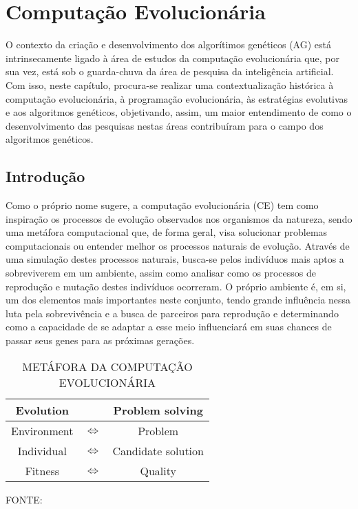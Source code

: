\chapter{Computação Evolucionária}

O contexto da criação e desenvolvimento dos algorítimos genéticos (AG) está intrinsecamente ligado à área de estudos da computação evolucionária que, por sua vez, está sob o guarda-chuva da área de pesquisa da inteligência artificial. Com isso, neste capítulo, procura-se realizar uma contextualização histórica à computação evolucionária, à programação evolucionária, às estratégias evolutivas e aos algoritmos genéticos, objetivando, assim, um maior entendimento de como o desenvolvimento das pesquisas nestas áreas contribuíram para o campo dos algoritmos genéticos.

\section{Introdução}

Como o próprio nome sugere, a computação evolucionária (CE) tem como inspiração os processos de evolução observados nos organismos da natureza, sendo uma metáfora computacional que, de forma geral, visa solucionar problemas computacionais ou entender melhor os processos naturais de evolução. Através de uma simulação destes processos naturais, busca-se pelos indivíduos mais aptos a sobreviverem em um ambiente, assim como analisar como os processos de reprodução e mutação destes indivíduos ocorreram. O próprio ambiente é, em si, um dos elementos mais importantes neste conjunto, tendo grande influência nessa luta pela sobrevivência e a busca de parceiros para reprodução e determinando como a capacidade de se adaptar a esse meio influenciará em suas chances de passar seus genes para as próximas gerações.

\begin{table}[h!]
	\caption{\uppercase{Metáfora da Computação Evolucionária}}
	\small
	\centering
	\vspace{2pt}
	\def\arraystretch{1.2}
	\begin{tabular}{ |ccc| }
		\hline
		Evolution & ~ & Problem solving \\ \hline
		Environment & $\Longleftrightarrow$ & Problem \\
		Individual & $\Longleftrightarrow$ & Candidate solution \\
		Fitness & $\Longleftrightarrow$ & Quality \\ \hline
	\end{tabular}
	\label{tab:EvolutionaryComputingMetaphor}
	\begin{minipage}{1 \textwidth}
		\centering
		\vspace{6pt}
		FONTE:~\cite{eiben_introduction_2015}
	\end{minipage}
\end{table}

